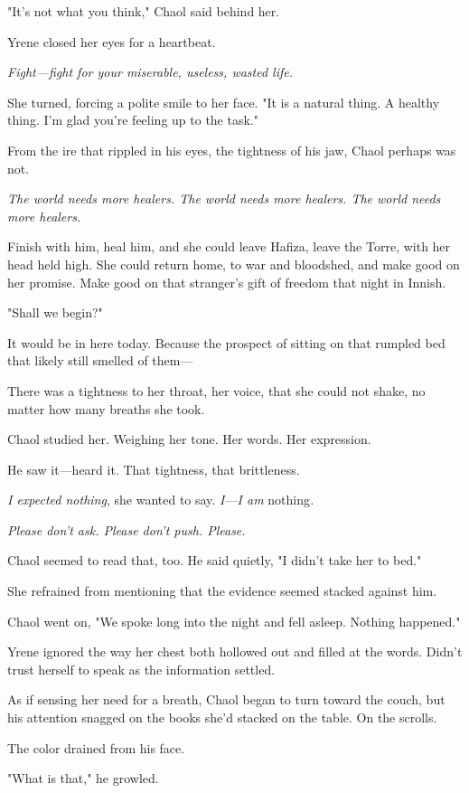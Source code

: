 "It's not what you think," Chaol said behind her.

Yrene closed her eyes for a heartbeat.

\emph{Fight---fight for your miserable, useless, wasted life.}

She turned, forcing a polite smile to her face. "It is a natural thing. A healthy thing. I'm glad you're feeling  up to the task."

From the ire that rippled in his eyes, the tightness of his jaw, Chaol perhaps was not.

\emph{The world needs more healers. The world needs more healers. The world needs more healers.}

Finish with him, heal him, and she could leave Hafiza, leave the Torre, with her head held high. She could return home, to war and bloodshed, and make good on her promise. Make good on that stranger's gift of freedom that night in Innish.

"Shall we begin?"

It would be in here today. Because the prospect of sitting on that rumpled bed that likely still smelled of them---

There was a tightness to her throat, her voice, that she could not shake, no matter how many breaths she took.

Chaol studied her. Weighing her tone. Her words. Her expression.

He saw it---heard it. That tightness, that brittleness.

\emph{I expected nothing}, she wanted to say. \emph{I---I am}
nothing\emph{.}

\emph{Please don't ask. Please don't push. Please.}

Chaol seemed to read that, too. He said quietly, "I didn't take her to bed."

She refrained from mentioning that the evidence seemed stacked against him.

Chaol went on, "We spoke long into the night and fell asleep. Nothing happened."

Yrene ignored the way her chest both hollowed out and filled at the words. Didn't trust herself to speak as the information settled.

As if sensing her need for a breath, Chaol began to turn toward the couch, but his attention snagged on the books she'd stacked on the table. On the scrolls.

The color drained from his face.

"What is that," he growled.

